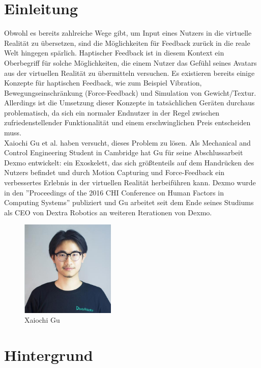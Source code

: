 \chapter{Einleitung}\label{Einleitung}
Obwohl es bereits zahlreiche Wege gibt, um Input eines Nutzers in die virtuelle Realität zu übersetzen, sind die Möglichkeiten für Feedback zurück in die reale Welt hingegen spärlich. Haptischer Feedback ist in diesem Kontext ein Oberbegriff für solche Möglichkeiten, die einem Nutzer das Gefühl seines Avatars aus der virtuellen Realität zu übermitteln versuchen. Es existieren bereits einige Konzepte für haptischen Feedback, wie zum Beispiel Vibration, Bewegungseinschränkung (Force-Feedback) und Simulation von Gewicht/Textur. Allerdings ist die Umsetzung dieser Konzepte in tatsächlichen Geräten durchaus problematisch, da sich ein normaler Endnutzer in der Regel zwischen zufriedenstellender Funktionalität und einem erschwinglichen Preis entscheiden muss.\\
Xaiochi Gu et al. haben versucht, dieses Problem zu lösen. Als Mechanical and Control Engineering Student in Cambridge hat Gu für seine Abschlussarbeit Dexmo entwickelt: ein Exoskelett, das sich größtenteils auf dem Handrücken des Nutzers befindet und durch Motion Capturing und Force-Feedback ein verbessertes Erlebnis in der virtuellen Realität herbeiführen kann. Dexmo wurde in den ''Proceedings of the 2016 CHI Conference on Human Factors in Computing Systems'' publiziert und Gu arbeitet seit dem Ende seines Studiums als CEO von Dextra Robotics an weiteren Iterationen von Dexmo. 

\begin{figure}[!ht] %
\centering
\includegraphics[width=0.4\textwidth]{images/xiaochi.png}
\caption{Xaiochi Gu}
\end{figure}


\chapter{Hintergrund}\label{Hintergrund}

